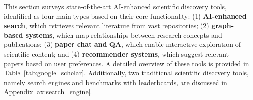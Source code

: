 
This section surveys state-of-the-art AI-enhanced scientific discovery tools, identified as four main types based on their core functionality: (1) \textbf{AI-enhanced search}, which retrieves relevant literature from vast repositories; (2) \textbf{graph-based systems}, which map relationships between research concepts and publications; (3) \textbf{paper chat and QA}, which enable interactive exploration of scientific content; and (4) \textbf{recommender systems}, which suggest relevant papers based on user preferences. A detailed overview of these tools is provided in Table~\ref{tab:google_scholar}. Additionally, two traditional scientific discovery tools, namely search engines and benchmarks with leaderboards, are discussed in Appendix \ref{ax:search_engine}.




